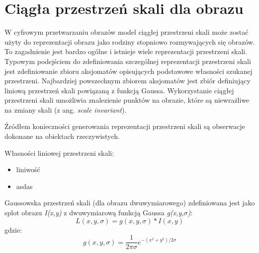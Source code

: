 \section{Ciągła przestrzeń skali dla obrazu}
W cyfrowym przetwarzaniu obrazów model ciągłej przestrzeni skali może zostać użyty do reprezentacji obrazu jako rodziny stopniowo rozmywających się obrazów. To zagadnienie jest bardzo ogólne i istnieje wiele reprezentacji przestrzeni skali. Typowym podejściem do zdefiniowania szczególnej reprezentacji przestrzeni skali jest zdefiniowanie zbioru aksjomatów opisujących podstawowe własności szukanej przestrzeni. Najbardziej powszechnym zbiorem aksjomatów jest zbiór definiujący liniową przestrzeń skali powiązaną z funkcją Gaussa. 
Wykorzystanie ciągłej przestrzeni skali umożliwia znalezienie punktów na obrazie, które są niewrażliwe na zmiany skali (z ang. \textit{scale invariant}).

Źródłem konieczności generowania reprezentacji przestrzeni skali są obserwacje dokonane na obiektach rzeczywistych. 

Własności liniowej przestrzeni skali:
\begin{itemize}
	\item liniwość
	\item asdas
\end{itemize}

Gaussowska przestrzeń skali (dla obrazu dwuwymiarowego) zdefiniowana jest jako splot obrazu \textit{I(x,y)} z dwuwymiarową funkcją Gaussa \textit{g(x,y,$\sigma$)}:
\begin{equation}
L(x,y,\sigma) = g(x,y,\sigma)*I(x,y)
\end{equation}
gdzie:
\begin{equation}
g(x,y,\sigma) = \frac{1}{2\pi\sigma}e^{-(x^2+y^2)/2\sigma}
\end{equation}

